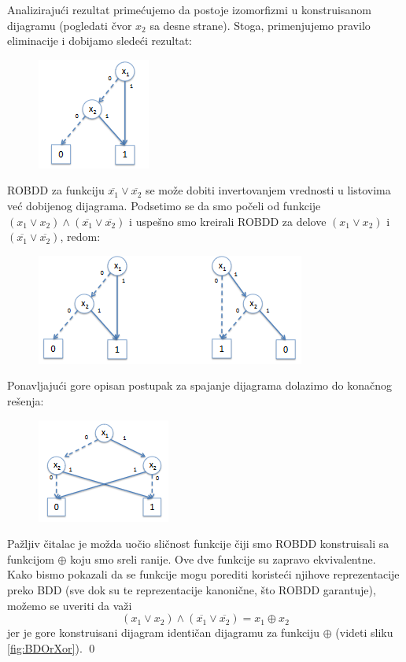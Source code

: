 \begin{exmp}
    Analiziraju\'c{}i rezultat prime\'c{}ujemo da postoje izomorfizmi u konstruisanom dijagramu (pogledati \v{c}vor $x_{2}$ sa desne strane). Stoga, primenjujemo pravilo eliminacije i dobijamo slede\'c{}i rezultat:

    \begin{figure}[H]
        \centering
        \includegraphics{slike/ROBDD_primer_8.PNG}
    \end{figure}

    ROBDD za funkciju $\overline{x_{1}} \vee \overline{x_{2}}$ se mo\v{z}e dobiti invertovanjem vrednosti u listovima ve\'c{} dobijenog dijagrama. Podsetimo se da smo po\v{c}eli od funkcije $(x_{1} \vee x_{2}) \wedge (\overline{x_{1}} \vee \overline{x_{2}})$ i uspe\v{s}no smo kreirali ROBDD za delove $(x_{1} \vee x_{2})$ i $(\overline{x_{1}} \vee \overline{x_{2}})$, redom:

    \begin{figure}[H]
        \centering
        \includegraphics{slike/ROBDD_primer_9.PNG}
    \end{figure}

    Ponavljaju\'c{}i gore opisan postupak za spajanje dijagrama dolazimo do kona\v{c}nog re\v{s}enja:

    \begin{figure}[H]
        \centering
        \includegraphics{slike/ROBDD_primer_10.PNG}
    \end{figure}

    Pa\v{z}ljiv \v{c}italac je mo\v{z}da uo\v{c}io sli\v{c}nost funkcije \v{c}iji smo ROBDD konstruisali sa funkcijom $\oplus$ koju smo sreli ranije. Ove dve funkcije su zapravo ekvivalentne. Kako bismo pokazali da se funkcije mogu porediti koriste\'c{}i njihove reprezentacije preko BDD (sve dok su te reprezentacije kanoni\v{c}ne, \v{s}to ROBDD garantuje), mo\v{z}emo se uveriti da va\v{z}i
    $$(x_{1} \vee x_{2}) \wedge (\overline{x_{1}} \vee \overline{x_{2}}) = x_{1} \oplus x_{2}$$
    jer je gore konstruisani dijagram identi\v{c}an dijagramu za funkciju $\oplus$ (videti sliku \ref{fig:BDOrXor}).
\qed
\end{exmp}
